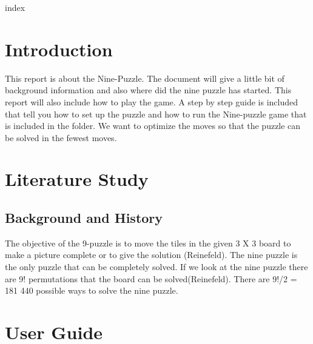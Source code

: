 \documentclass[10pt]{article}
\begin{document}

\newpage
index
\newpage
\section{Introduction}
This report is about the Nine-Puzzle.  The document will give a little bit of background information and also where did the nine puzzle has started.  This report will also include how to play the game. A step by step guide is included that tell you how to set up the puzzle and how to run the Nine-puzzle game that is included in the folder.  We want to optimize the moves so that the puzzle can be solved in the fewest moves.

\section{Literature Study}
\subsection{Background and History}
The objective of the 9-puzzle is to move the tiles in the given 3 X 3 board to make a picture complete or to give the solution (Reinefeld).  The nine puzzle is the only puzzle that can be completely solved.  If we look at the nine puzzle there are 9! permutations that the board can be solved(Reinefeld).  There are 9!/2 = 181 440 possible ways to solve the nine puzzle. 
\section{User Guide}
\end{document}
